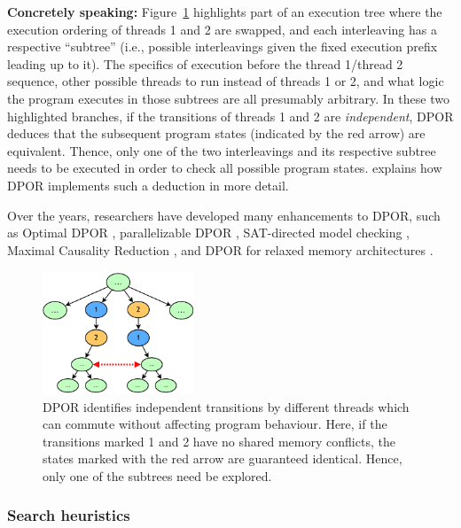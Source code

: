 {\bf Concretely speaking:}
Figure~\ref{fig:dpor} highlights part of an execution tree where the execution ordering of threads 1 and 2 are swapped,
and each interleaving has a respective ``subtree'' (i.e., possible interleavings given the fixed execution prefix leading up to it).
The specifics of execution before the thread 1/thread 2 sequence,
other possible threads to run instead of threads 1 or 2,
and what logic the program executes in those subtrees
are all presumably arbitrary.
In these two highlighted branches,
if the transitions of threads 1 and 2 are {\em independent},
DPOR deduces that the subsequent program states (indicated by the red arrow) are equivalent.
Thence, only one of the two interleavings and its respective subtree needs to be executed
in order to check all possible program states.
\sect{\ref{sec:landslide-dpor}} explains how DPOR implements such a deduction in more detail.

Over the years, researchers have developed many enhancements to DPOR, such as Optimal DPOR \cite{optimal-dpor}, parallelizable DPOR \cite{parallel-dpor}, SAT-directed model checking \cite{satcheck}, Maximal Causality Reduction \cite{mcr}, and DPOR for relaxed memory architectures \cite{tsopso}.

\begin{figure}[t]
	\begin{center}
	\includegraphics[width=0.4\textwidth]{dpor.pdf}
	\end{center}
	\caption{DPOR identifies independent transitions by different threads which can commute without affecting program behaviour. Here, if the transitions marked 1 and 2 have no shared memory conflicts, the states marked with the red arrow are guaranteed identical. Hence, only one of the subtrees need be explored.}
	\label{fig:dpor}
\end{figure}

\subsubsection{Search heuristics}

